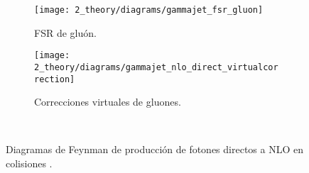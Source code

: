 \begin{figure}[ht!]
    \centering
    \begin{subfigure}[h]{0.49\linewidth}
        \centering
        \texttt{[image: 2\_theory/diagrams/gammajet\_fsr\_gluon]}
        \caption{\Ac{FSR} de gluón.}
        \label{fig:theory:sm:prompt_photon:feynman_nlo_direct:gluon}
    \end{subfigure}
    \hfill
    \begin{subfigure}[h]{0.49\linewidth}
        \centering
        \texttt{[image: 2\_theory/diagrams/gammajet\_nlo\_direct\_virtualcorrection]}
        \caption{Correcciones virtuales de gluones.}
        \label{fig:theory:sm:prompt_photon:feynman_nlo_direct:gluon_virtual}
    \end{subfigure}\\
    \caption{Diagramas de Feynman de producción de fotones directos a \ac{NLO} en colisiones \pp.}
    \label{fig:theory:sm:prompt_photon:feynman_nlo_direct}
\end{figure}

